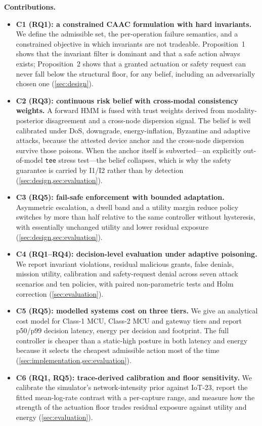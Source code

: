 \noindent\textbf{Contributions.}
\begin{itemize}
  \item \textbf{C1 (RQ1): a constrained CAAC formulation with hard invariants.}
  We define the admissible set, the per-operation failure semantics, and a
  constrained objective in which invariants are not tradeable. Proposition~1
  shows that the invariant filter is dominant and that a safe action always
  exists; Proposition~2 shows that a granted actuation or safety request can never
  fall below the structural floor, for any belief, including an adversarially
  chosen one
  (\cref{sec:design}).
  \item \textbf{C2 (RQ3): continuous risk belief with cross-modal consistency
  weights.} A forward HMM is fused with trust weights derived from
  modality-posterior disagreement and a cross-node dispersion signal. The belief
  is well calibrated under DoS, downgrade, energy-inflation, Byzantine and
  adaptive attacks, because the attested device anchor and the cross-node
  dispersion survive those poisons. When the anchor itself is subverted---an
  explicitly out-of-model \texttt{tee} stress test---the belief collapses, which
  is why the safety guarantee is carried by I1/I2 rather than by detection
  (\cref{sec:design,sec:evaluation}).
  \item \textbf{C3 (RQ5): fail-safe enforcement with bounded adaptation.}
  Asymmetric escalation, a dwell band and a utility margin reduce policy
  switches by more than half relative to the same controller without hysteresis,
  with essentially unchanged utility and lower residual exposure
  (\cref{sec:design,sec:evaluation}).
  \item \textbf{C4 (RQ1--RQ4): decision-level evaluation under adaptive
  poisoning.} We report invariant violations, residual malicious grants,
  false denials, mission utility, calibration and safety-request denial across
  seven attack scenarios and ten policies, with paired non-parametric tests and
  Holm correction (\cref{sec:evaluation}).
  \item \textbf{C5 (RQ5): modelled systems cost on three tiers.} We give an
  analytical cost model for Class-1 MCU, Class-2 MCU and gateway tiers and report
  p50/p99 decision latency, energy per decision and footprint. The full
  controller is cheaper than a static-high posture in both latency and energy
  because it selects the cheapest admissible action most of the time
  (\cref{sec:implementation,sec:evaluation}).
  \item \textbf{C6 (RQ1, RQ5): trace-derived calibration and floor sensitivity.}
  We calibrate the simulator's network-intensity prior against IoT-23, report the
  fitted mean-log-rate contrast with a per-capture range, and measure how the
  strength of the actuation floor trades residual exposure against utility and
  energy
  (\cref{sec:evaluation}).
\end{itemize}

